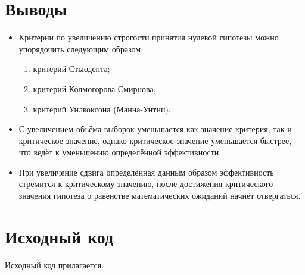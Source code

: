 \documentclass{article} %
\begin{document}
\section*{Выводы}
\begin{itemize}
    \item Критерии по увеличению строгости принятия нулевой гипотезы
        можно упорядочить следующим образом:
        \begin{enumerate}
            \item критерий Стьюдента;
            \item критерий Колмогорова-Смирнова;
            \item критерий Уилкоксона (Манна-Уитни).
        \end{enumerate}
    \item С увеличением объёма выборок уменьшается как
        значение критерия, так и критическое значение,
        однако критическое значение уменьшается быстрее,
        что ведёт к уменьшению определённой эффективности.
    \item При увеличение сдвига определённая данным образом
        эффективность стремится к критическому значению,
        после достижения критического значения
        гипотеза о равенстве математических ожиданий
        начнёт отвергаться.
\end{itemize}

\section*{Исходный код}
Исходный код прилагается.
\end{document}
